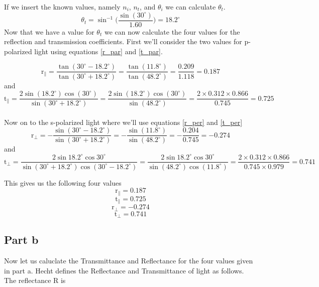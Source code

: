 \documentclass{article}
\begin{document}
	If we insert the known values, namely $n_i$, $n_t$, and $\theta_i$ we can calculate $\theta_t$.
	\begin{equation*}
		\theta_t = \sin^{-1}\Big(\dfrac{\sin (30^\circ)}{1.60}\Big) = 18.2^\circ
	\end{equation*}
	Now that we have a value for $\theta_t$ we can now calculate the four values for the reflection and transmission coefficients. First we'll 
	consider the two values for p-polarized light using equations \ref{r_par} and \ref{t_par}. 
	
	\begin{equation*}
		\mathrm{r}_\parallel = \dfrac{\tan (30^\circ - 18.2^\circ)}{\tan (30^\circ + 18.2^\circ)} = 
		\dfrac{\tan (11.8^\circ)}{\tan (48.2^\circ)} = \dfrac{0.209}{1.118} = 0.187
	\end{equation*}
	and
	\begin{equation*}
		\mathrm{t}_\parallel = \dfrac{2\sin(18.2^\circ)\cos(30^\circ)}{\sin(30^\circ + 18.2^\circ)} =
		\dfrac{2\sin(18.2^\circ)\cos(30^\circ)}{\sin(48.2^\circ)} = \dfrac{2 \times 0.312 \times 0.866}{0.745} = 0.725 
	\end{equation*}
	\\
	Now on to the s-polarized light where we'll use equations \ref{r_per} and \ref{t_per}
	\begin{equation*}
		\mathrm{r}_\bot = -\dfrac{\sin (30^\circ - 18.2^\circ)}{\sin (30^\circ + 18.2^\circ)} = 
		-\dfrac{\sin (11.8^\circ)}{\sin (48.2^\circ)} = -\dfrac{0.204}{0.745} = -0.274 
	\end{equation*}
	and
	\begin{equation*}
		\mathrm{t}_\bot = \dfrac{2\sin18.2^\circ\cos30^\circ}{\sin(30^\circ + 18.2^\circ)\cos(30^\circ - 18.2^\circ)} = 
		\dfrac{2\sin18.2^\circ\cos30^\circ}{\sin(48.2^\circ)\cos(11.8^\circ)} = 
		\dfrac{2 \times 0.312 \times 0.866}{0.745 \times 0.979} = 0.741
	\end{equation*}
	
	This gives us the following four values
	$$ \mathrm{r}_\parallel = 0.187 $$
	$$ \mathrm{t}_\parallel = 0.725 $$
	$$ \mathrm{r}_\bot = -0.274 $$
	$$ \mathrm{t}_\bot = 0.741 $$

	\pagebreak
	\subsection*{Part b}
	
	Now let us caluclate the Transmittance and Reflectance for the four values given in part a. Hecht defines the Reflectance and Transmittance of
	light as follows. The reflectance R is
	
\end{document}
